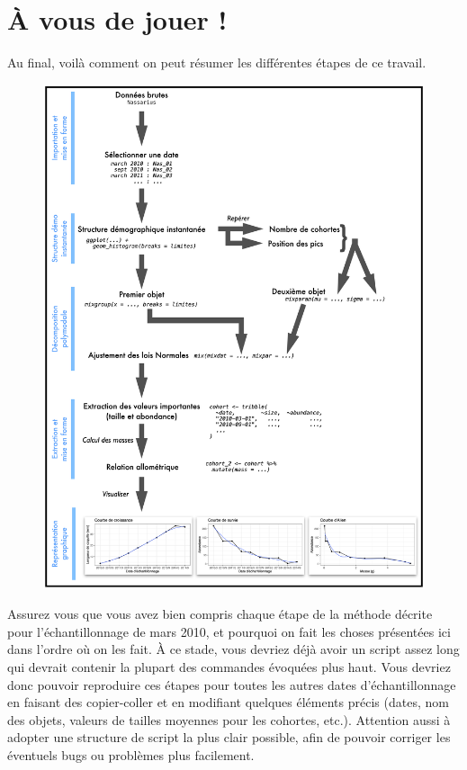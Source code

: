 \documentclass[
  a4paper,
  DIV=11,
  numbers=noendperiod,
  oneside]{scrreprt}
\begin{document}
\hypertarget{uxe0-vous-de-jouer}{%
\section{À vous de jouer !}\label{uxe0-vous-de-jouer}}

Au final, voilà comment on peut résumer les différentes étapes de ce
travail.

\begin{figure}

{\centering \includegraphics{images/diagram.png}

}

\end{figure}

Assurez vous que vous avez bien compris chaque étape de la méthode
décrite pour l'échantillonnage de mars 2010, et pourquoi on fait les
choses présentées ici dans l'ordre où on les fait. À ce stade, vous
devriez déjà avoir un script assez long qui devrait contenir la plupart
des commandes évoquées plus haut. Vous devriez donc pouvoir reproduire
ces étapes pour toutes les autres dates d'échantillonnage en faisant des
copier-coller et en modifiant quelques éléments précis (dates, nom des
objets, valeurs de tailles moyennes pour les cohortes, etc.). Attention
aussi à adopter une structure de script la plus clair possible, afin de
pouvoir corriger les éventuels bugs ou problèmes plus facilement.
\end{document}
